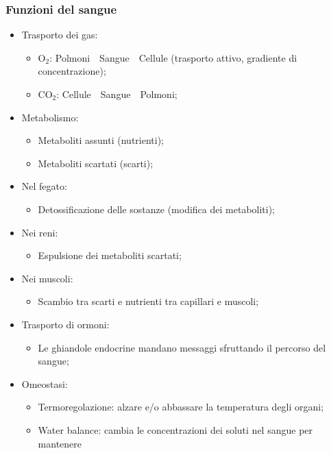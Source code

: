 \documentclass{article}
\begin{document}
\subsubsection{Funzioni del sangue}
\begin{itemize}
    \item Trasporto dei gas:
        \begin{itemize}
            \item O$_2$: Polmoni\ \textrightarrow\ Sangue\ \textrightarrow\ Cellule (trasporto
                attivo, gradiente di concentrazione);
            \item CO$_2$: Cellule\ \textrightarrow\ Sangue\ \textrightarrow\ Polmoni;
        \end{itemize}
    \item Metabolismo:
        \begin{itemize}
            \item Metaboliti assunti (nutrienti);
            \item Metaboliti scartati (scarti);
        \end{itemize}
    \item Nel fegato:
        \begin{itemize}
            \item Detossificazione delle sostanze (modifica dei metaboliti);
        \end{itemize}
    \item Nei reni:
        \begin{itemize}
            \item Espulsione dei metaboliti scartati;
        \end{itemize}
    \item Nei muscoli:
        \begin{itemize}
            \item Scambio tra scarti e nutrienti tra capillari e muscoli;
        \end{itemize}
    \item Trasporto di ormoni:
        \begin{itemize}
            \item Le ghiandole endocrine mandano messaggi sfruttando il percorso del sangue;
        \end{itemize}
    \item Omeostasi:
        \begin{itemize}
            \item Termoregolazione: alzare e/o abbassare la temperatura degli organi;
            \item Water balance: cambia le concentrazioni dei soluti nel sangue per mantenere

\end{itemize}
\end{itemize}
\end{document}
